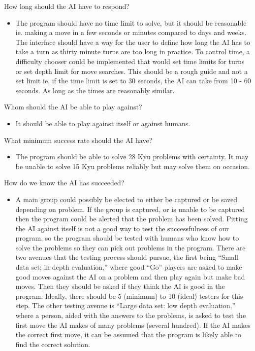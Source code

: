 \documentclass{l3proj}
\begin{document}
How long should the AI have to respond?
\begin{itemize}
\item The program should have no time limit to solve, but it should be reasonable ie. making a move in a few seconds or minutes compared to days and weeks.  The interface should have a way for the user to define how long the AI has to take a turn as thirty minute turns are too long in practice.  To control time, a difficulty chooser could be implemented that would set time limits for turns or set depth limit for move searches.  This should be a rough guide and not a set limit ie. if the time limit is set to 30 seconds, the AI can take from 10 - 60 seconds. As long as the times are reasonably similar.
\end{itemize}
Whom should the AI be able to play against?
\begin{itemize}
\item It should be able to play against itself or against humans.
\end{itemize}
What minimum success rate should the AI have?
\begin{itemize}
\item The program should be able to solve 28 Kyu problems with certainty.  It may be unable to solve 15 Kyu problems reliably but may solve them on occasion.
\end{itemize}
How do we know the AI has succeeded?
\begin{itemize}
\item A main group could possibly be elected to either be captured or be saved depending on problem.  If the group is captured, or is unable to be captured then the program could be alerted that the problem has been solved.  Pitting the AI against itself is not a good way to test the successfulness of our program, so the program should be tested with humans who know how to solve the problems so they can pick out problems in the program. There are two avenues that the testing process should pursue, the first being “Small data set; in depth evaluation,” where good “Go” players are asked to make good moves against the AI on a problem and then play again but make bad moves. Then they should be asked if they think the AI is good in the program.  Ideally, there should be 5 (minimum) to 10 (ideal) testers for this step.  The other testing avenue is “Large data set: low depth evaluation,” where a person, aided with the answers to the problems, is asked to test the first move the AI makes of many problems (several hundred). If the AI makes the correct first move, it can be assumed that the program is likely able to find the correct solution.
\end{itemize}
\end{document}
